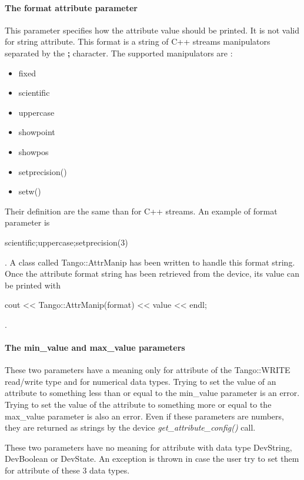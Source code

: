 \paragraph{The format attribute parameter}

This parameter specifies how the attribute value should be printed.
It is not valid for string attribute. This format is a string of C++
streams manipulators separated by the \textbf{;} character. The supported
manipulators are :
\begin{itemize}
\item fixed
\item scientific
\item uppercase
\item showpoint
\item showpos
\item setprecision()
\item setw()
\end{itemize}
Their definition are the same than for C++ streams. An example of
format parameter is \begin{center}scientific;uppercase;setprecision(3)\end{center}.
A class called Tango::AttrManip has been written to handle this format
string. Once the attribute format string has been retrieved from the
device, its value can be printed with \begin{center}cout <\textcompwordmark{}<
Tango::AttrManip(format) <\textcompwordmark{}< value <\textcompwordmark{}<
endl;\end{center}.


\paragraph{The min\_value and max\_value
parameters}

These two parameters have a meaning only for attribute of the Tango::WRITE
read/write type and for numerical data types. Trying to set the value
of an attribute to something less than or equal to the min\_value
parameter is an error. Trying to set the value of the attribute to
something more or equal to the max\_value parameter is also an error.
Even if these parameters are numbers, they are returned as strings
by the device \emph{get\_attribute\_config()} call. 

These two parameters have no meaning for attribute with data type
DevString, DevBoolean or DevState. An exception is thrown in case
the user try to set them for attribute of these 3 data types.


